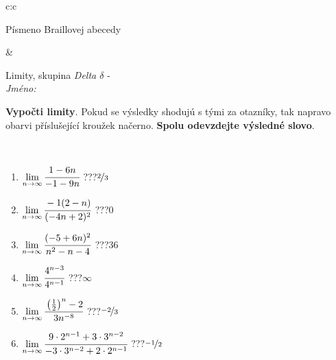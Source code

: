\documentclass[10pt]{report}
\begin{document}
\begin{tabular}{c:c}
\begin{minipage}[c][104.5mm][t]{0.5\linewidth}
\begin{center}
\begin{minipage}{0.20\linewidth}
\begin{center}
{\small Písmeno Braillovej abecedy}
\end{center}
\end{minipage}
\end{center}
\end{minipage}
&
\begin{minipage}[c][104.5mm][t]{0.5\linewidth}
\begin{center}
\vspace{7mm}
{\huge Limity, skupina \textit{Delta $\delta$} -}\\[5mm]
\textit{Jméno:}\phantom{xxxxxxxxxxxxxxxxxxxxxxxxxxxxxxxxxxxxxxxxxxxxxxxxxxxxxxxxxxxxxxxxx}\\[5mm]
\begin{minipage}{0.95\linewidth}
\begin{center}
\textbf{Vypočti limity}. Pokud se výsledky shodujú s tými za otazníky, tak napravo\\obarvi příslušející kroužek načerno. \textbf{Spolu odevzdejte výsledné slovo}.
\end{center}
\end{minipage}
\\[1mm]
\begin{minipage}{0.79\linewidth}
\begin{center}
\begin{varwidth}{\linewidth}
\begin{enumerate}
\normalsize
\item $\lim\limits_{n\to\infty}\cfrac{1-6n}{-1-9n}$\quad \dotfill\; ???\;\dotfill \quad $\nicefrac{2}{3}$
\item $\lim\limits_{n\to\infty}\cfrac{-1(2-n)}{(-4n+2)^2}$\quad \dotfill\; ???\;\dotfill \quad $0$
\item $\lim\limits_{n\to\infty}\cfrac{(-5+6n)^2}{n^2-n-4}$\quad \dotfill\; ???\;\dotfill \quad $36$
\item $\lim\limits_{n\to\infty}\cfrac{4^{n-3}}{4^{n-1}}$\quad \dotfill\; ???\;\dotfill \quad $\infty$
\item $\lim\limits_{n\to\infty}\cfrac{\left(\frac{1}{2}\right)^n -2}{3n^{-8}}$\quad \dotfill\; ???\;\dotfill \quad $\nicefrac{-2}{3}$
\item $\lim\limits_{n\to\infty}\cfrac{9\cdot 2^{n-1}+3\cdot 3^{n-2}}{-3\cdot 3^{n-2}+2\cdot 2^{n-1}}$\quad \dotfill\; ???\;\dotfill \quad $\nicefrac{-1}{2}$
\end{enumerate}
\end{varwidth}
\end{center}
\end{minipage}

\end{center}
\end{minipage}
\end{tabular}
\end{document}

